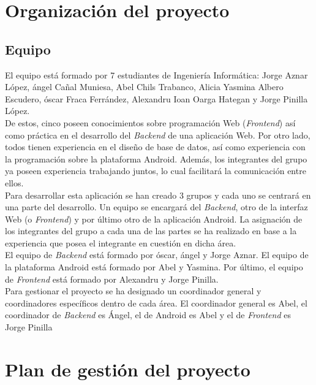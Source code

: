 \documentclass[12pt]{article}%
\begin{document}

\section{Organizaci\'on del proyecto} %
\subsection{Equipo}

El equipo est\'a formado por 7 estudiantes de Ingenier\'ia Inform\'atica: Jorge Aznar L\'opez, \'angel Ca\~nal Muniesa, Abel Chils Trabanco, Alicia Yasmina Albero Escudero, \'oscar Fraca Ferr\'andez, Alexandru Ioan Oarga Hategan y Jorge Pinilla L\'opez.\\

De estos, cinco poseen conocimientos sobre programaci\'on Web (\textit{Frontend}) as\'i como pr\'actica en el desarrollo del \textit{Backend} de una aplicaci\'on Web. Por otro lado, todos tienen experiencia en el dise\~no de base de datos, as\'i como experiencia con la programaci\'on sobre la plataforma Android. Adem\'as, los integrantes del grupo ya poseen experiencia trabajando juntos, lo cual facilitar\'a la comunicaci\'on entre ellos. \\

Para desarrollar esta aplicaci\'on se han creado 3 grupos y cada uno se centrar\'a en una parte del desarrollo. Un equipo se encargar\'a del
\textit{Backend}, otro de la interfaz Web (o \textit{Frontend}) y por \'ultimo otro de la aplicaci\'on Android. La asignaci\'on de los integrantes del grupo a cada una de las partes se ha realizado en base a la experiencia que posea el integrante en cuesti\'on en dicha \'area.\\

El equipo de \textit{Backend} est\'a formado por \'oscar, \'angel y Jorge Aznar. El equipo de la plataforma Android est\'a formado por Abel y Yasmina. Por \'ultimo, el equipo de \textit{Frontend} est\'a formado por Alexandru y Jorge Pinilla. \\

Para gestionar el proyecto se ha designado un coordinador general y coordinadores específicos dentro de cada área. El coordinador general es Abel, el coordinador de \textit{Backend} es Ángel, el de Android es Abel y el de \textit{Frontend} es Jorge Pinilla


\section{Plan de gesti\'on del proyecto} %
\end{document}
